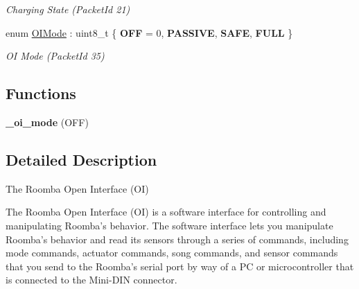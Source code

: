 \begin{DoxyCompactItemize}
\begin{DoxyCompactList}\small\item\em Charging State (Packet\+Id 21) \end{DoxyCompactList}\item 
\hypertarget{namespaceroomba_1_1series500_1_1oi_a8dde6b4ac23e862ae50868c3963d7063}{enum \hyperlink{namespaceroomba_1_1series500_1_1oi_a8dde6b4ac23e862ae50868c3963d7063}{O\+I\+Mode} \+: uint8\+\_\+t \{ {\bfseries O\+F\+F} = 0, 
{\bfseries P\+A\+S\+S\+I\+V\+E}, 
{\bfseries S\+A\+F\+E}, 
{\bfseries F\+U\+L\+L}
 \}}\label{namespaceroomba_1_1series500_1_1oi_a8dde6b4ac23e862ae50868c3963d7063}

\begin{DoxyCompactList}\small\item\em O\+I Mode (Packet\+Id 35) \end{DoxyCompactList}\end{DoxyCompactItemize}
\subsection*{Functions}
\begin{DoxyCompactItemize}
\item 
\hypertarget{namespaceroomba_1_1series500_1_1oi_ae780d226077205cf8c321416c9a8471d}{{\bfseries \+\_\+oi\+\_\+mode} (O\+F\+F)}\label{namespaceroomba_1_1series500_1_1oi_ae780d226077205cf8c321416c9a8471d}

\end{DoxyCompactItemize}


\subsection{Detailed Description}
The Roomba Open Interface (O\+I) 

The Roomba Open Interface (O\+I) is a software interface for controlling and manipulating Roomba’s behavior. The software interface lets you manipulate Roomba’s behavior and read its sensors through a series of commands, including mode commands, actuator commands, song commands, and sensor commands that you send to the Roomba’s serial port by way of a P\+C or microcontroller that is connected to the Mini-\/\+D\+I\+N connector. 